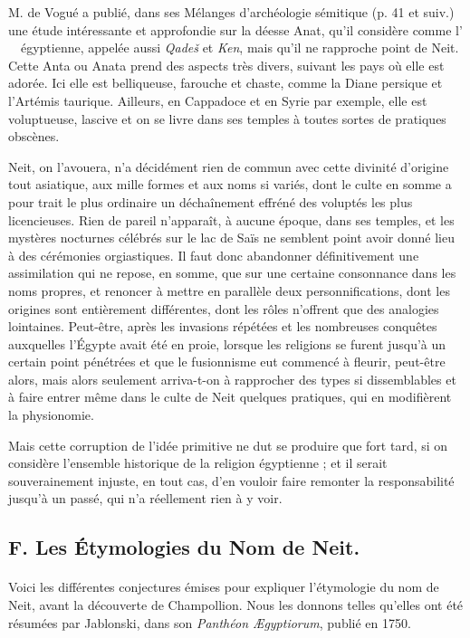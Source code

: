 \documentclass[a4paper, 11pt, oneside]{article}
\newcommand*\hieroAAAH{}
\newcommand*\hieroAACD{}
\newcommand*\hieroAALA{}
\newcommand*\hieroABEU{}
\begin{document}
M. de Vogué a publié, dans ses Mélanges d'archéologie sémitique (p. 41 et suiv.) une étude intéressante et approfondie sur la déesse Anat, qu'il considère comme l'$\hieroABEU\:\hieroAACD\allowbreak\:\hieroAAAH\:\hieroAALA$ égyptienne, appelée aussi \emph{Qadeš} et \emph{Ken}, mais qu'il ne rapproche point de Neit. Cette Anta ou Anata prend des aspects très divers, suivant les pays où elle est adorée. Ici elle est belliqueuse, farouche et chaste, comme la Diane persique et l'Artémis taurique. Ailleurs, en Cappadoce et en Syrie par exemple, elle est voluptueuse, lascive et on se livre dans ses temples à toutes sortes de pratiques obscènes.

Neit, on l'avouera, n'a décidément rien de commun avec cette divinité d'origine tout asiatique, aux mille formes et aux noms si variés, dont le culte en somme a pour trait le plus ordinaire un déchaînement effréné des voluptés les plus licencieuses. Rien de pareil n'apparaît, à aucune époque, dans ses temples, et les mystères nocturnes célébrés sur le lac de Saïs ne semblent point avoir donné lieu à des cérémonies orgiastiques. Il faut donc abandonner définitivement une assimilation qui ne repose, en somme, que sur une certaine consonnance dans les noms propres, et renoncer à mettre en parallèle deux personnifications, dont les origines sont entièrement différentes, dont les rôles n'offrent que des analogies lointaines. Peut-être, après les invasions répétées et les nombreuses conquêtes auxquelles l'Égypte avait été en proie, lorsque les religions se furent jusqu'à un certain point pénétrées et que le fusionnisme eut commencé à fleurir, peut-être alors, mais alors seulement arriva-t-on à rapprocher des types si dissemblables et à faire entrer même dans le culte de Neit quelques pratiques, qui en modifièrent la physionomie.

Mais cette corruption de l'idée primitive ne dut se produire que fort tard, si on considère l'ensemble historique de la religion égyptienne ; et il serait souverainement injuste, en tout cas, d'en vouloir faire remonter la responsabilité jusqu'à un passé, qui n'a réellement rien à y voir.
\clearpage
\subsection{F. Les Étymologies du Nom de Neit.}
\paragraph{}
Voici les différentes conjectures émises pour expliquer l'étymologie du nom de Neit, avant la découverte de Champollion. Nous les donnons telles qu'elles ont été résumées par Jablonski, dans son \emph{Panthéon Ægyptiorum}, publié en 1750.
\end{document}
